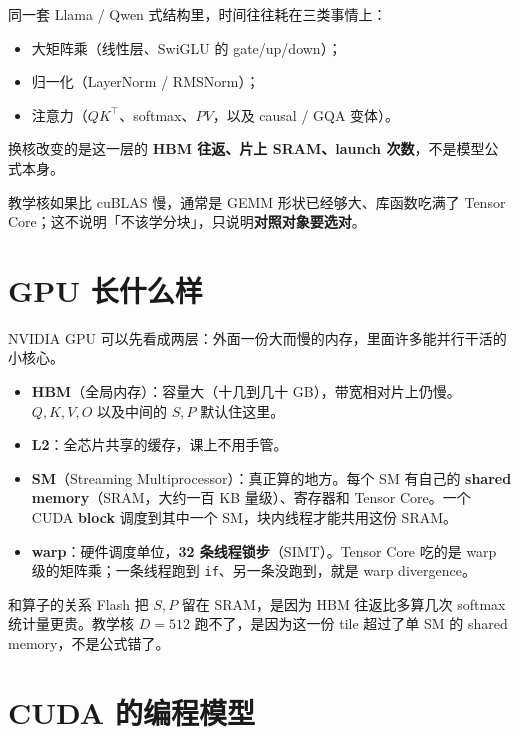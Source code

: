 同一套 Llama / Qwen 式结构里，时间往往耗在三类事情上：

\begin{itemize}
  \item 大矩阵乘（线性层、SwiGLU 的 gate/up/down）；
  \item 归一化（LayerNorm / RMSNorm）；
  \item 注意力（$QK^\top$、softmax、$PV$，以及 causal / GQA 变体）。
\end{itemize}

换核改变的是这一层的 \textbf{HBM 往返、片上 SRAM、launch 次数}，不是模型公式本身。

\figmemhier

教学核如果比 cuBLAS 慢，通常是 GEMM 形状已经够大、库函数吃满了 Tensor Core；这不说明「不该学分块」，只说明\textbf{对照对象要选对}。

\section{GPU 长什么样}

NVIDIA GPU 可以先看成两层：外面一份大而慢的内存，里面许多能并行干活的小核心。

\figgpuhier

\begin{itemize}
  \item \textbf{HBM}（全局内存）：容量大（十几到几十 GB），带宽相对片上仍慢。$Q,K,V,O$ 以及中间的 $S,P$ 默认住这里。
  \item \textbf{L2}：全芯片共享的缓存，课上不用手管。
  \item \textbf{SM}（Streaming Multiprocessor）：真正算的地方。每个 SM 有自己的 \textbf{shared memory}（SRAM，大约一百 KB 量级）、寄存器和 Tensor Core。一个 CUDA \textbf{block} 调度到其中一个 SM，块内线程才能共用这份 SRAM。
  \item \textbf{warp}：硬件调度单位，\textbf{32 条线程锁步}（SIMT）。Tensor Core 吃的是 warp 级的矩阵乘；一条线程跑到 \texttt{if}、另一条没跑到，就是 warp divergence。
\end{itemize}

\begin{proposition}{和算子的关系}
Flash 把 $S,P$ 留在 SRAM，是因为 HBM 往返比多算几次 softmax 统计量更贵。教学核 $D=512$ 跑不了，是因为这一份 tile 超过了单 SM 的 shared memory，不是公式错了。
\end{proposition}

\section{CUDA 的编程模型}

